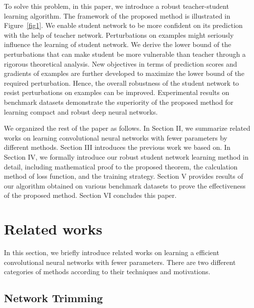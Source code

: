 \documentclass[journal]{IEEEtran}
\newcommand{\Fref}[1]{Figure~\ref{#1}}
\begin{document}
To solve this problem, in this paper, we introduce a robust teacher-student learning algorithm. The framework of the proposed method is illustrated in \Fref{fig1}. We enable student network to be more confident on its prediction with the help of teacher network. Perturbations on examples might seriously influence the learning of student network. We derive the lower bound of the perturbations that can make student be more vulnerable than teacher through a rigorous theoretical analysis. New objectives in terms of prediction scores and gradients of examples are further developed to maximize the lower bound of the required perturbation. Hence, the overall robustness of the student network to resist perturbations on examples can be improved. Experimental results on benchmark datasets demonstrate the superiority of the proposed method for learning compact and robust deep neural networks.

We organized the rest of the paper as follows. In Section II, we summarize related works on learning convolutional neural networks with fewer parameters by different methods. Section III introduces the previous work we based on. In Section IV, we formally introduce our robust student network learning method in detail, including mathematical proof to the proposed theorem, the calculation method of loss function, and the training strategy. Section V provides results of our algorithm obtained on various benchmark datasets to prove the effectiveness of the proposed method. Section VI concludes this paper.

\section{Related works}
In this section, we briefly introduce related works on learning a efficient convolutional neural networks with fewer parameters. There are two different categories of methods according to their techniques and motivations.

\subsection{Network Trimming}
  
\end{document}
